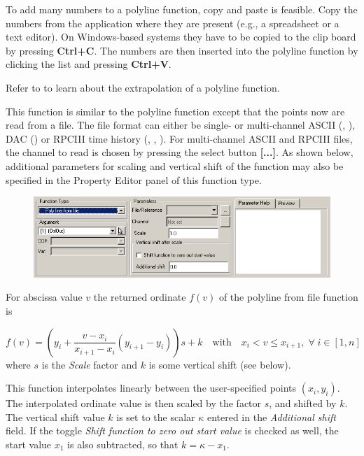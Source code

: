To add many numbers to a polyline function, copy and paste is feasible.
Copy the numbers from the application where they are present (e.g., a
spreadsheet or a text editor). On Windows-based systems they have to be copied
to the clip board by pressing \textbf{Ctrl+C}. The numbers are then inserted
into the polyline function by clicking the list and pressing \textbf{Ctrl+V}.

Refer to  to learn about the
extrapolation of a polyline function.


This function is similar to the polyline function except that the points now are
read from a file. The file format can either be single- or multi-channel
ASCII (, ), DAC () or RPCIII time history
(, , ).
For multi-channel ASCII and RPCIII files, the channel to read is chosen by
pressing the select button \textbf{[...]}. As shown below,
additional parameters for scaling and vertical shift of the function may also
be specified in the Property Editor panel of this function type.

\clearpage
\begin{figure}[H]
  \includegraphics[width=\textwidth]{Figures/4-FunctionPolylineFromFile}
\end{figure}

For abscissa value $v$ the returned ordinate $f(v)$ of the polyline from file
function is

$$
  f(v) = \left(y_i + \frac{v-x_i}{x_{i+1} - x_i}(y_{i+1}-y_i)\right)s + k
  \quad\mbox{with}\quad
  x_i < v \leq x_{i+1}, \; \forall\; i\in[1,n]
$$
where $s$ is the {\sl Scale} factor and $k$ is some vertical shift (see below).

This function interpolates linearly between the user-specified points
$(x_i, y_i)$. The interpolated ordinate value is then scaled by the factor $s$,
and shifted by $k$. The vertical shift value $k$ is set to the scalar $\kappa$
entered in the {\sl Additional shift} field.
If the toggle {\sl Shift function to zero out start value} is checked as well,
the start value $x_1$ is also subtracted, so that $k=\kappa-x_1$.

